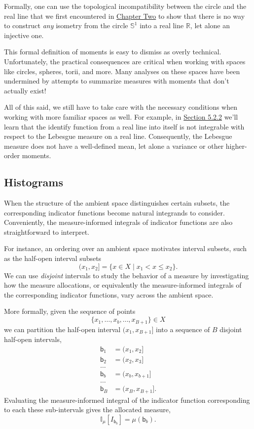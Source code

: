 \documentclass[
  letterpaper,
  DIV=11,
  numbers=noendperiod]{scrartcl}
\begin{document}
Formally, one can use the topological incompatibility between the circle
and the real line that we first encountered in
\href{http://www.symplectomorphic.com/assets/chapters_html/spaces.html}{Chapter
Two} to show that there is no way to construct \emph{any} isometry from
the circle \(\mathbb{S}^{1}\) into a real line \(\mathbb{R}\), let alone
an injective one.

This formal definition of moments is easy to dismiss as overly
technical. Unfortunately, the practical consequences are critical when
working with spaces like circles, spheres, torii, and more. Many
analyses on these spaces have been undermined by attempts to summarize
measures with moments that don't actually exist!

All of this said, we still have to take care with the necessary
conditions when working with more familiar spaces as well. For example,
in \hyperref[sec:practical_lebesgue]{Section 5.2.2} we'll learn that the
identify function from a real line into itself is not integrable with
respect to the Lebesgue measure on a real line. Consequently, the
Lebesgue measure does not have a well-defined mean, let alone a variance
or other higher-order moments.

\subsection{Histograms}\label{histograms}

When the structure of the ambient space distinguishes certain subsets,
the corresponding indicator functions become natural integrands to
consider. Conveniently, the measure-informed integrals of indicator
functions are also straightforward to interpret.

For instance, an ordering over an ambient space motivates interval
subsets, such as the half-open interval subsets \[
( x_{1}, x_{2} ] = \{ x \in X \mid x_{1} < x \le x_{2} \}.
\] We can use \emph{disjoint} intervals to study the behavior of a
measure by investigating how the measure allocations, or equivalently
the measure-informed integrals of the corresponding indicator functions,
vary across the ambient space.

More formally, given the sequence of points \[
\{ x_{1}, \ldots, x_{b}, \ldots, x_{B + 1} \} \in X
\] we can partition the half-open interval \((x_{1}, x_{B + 1}]\) into a
sequence of \(B\) disjoint half-open intervals, \begin{align*}
\mathsf{b}_{1} &= ( x_{1}, x_{2} ]
\\
\mathsf{b}_{2} &= ( x_{2}, x_{3} ]
\\
\ldots&
\\
\mathsf{b}_{b} &= ( x_{b}, x_{b + 1} ]
\\
\ldots&
\\
\mathsf{b}_{B} &= ( x_{B}, x_{B + 1} ].
\end{align*} Evaluating the measure-informed integral of the indicator
function corresponding to each these sub-intervals gives the allocated
measure, \[
\mathbb{I}_{\mu}[I_{\mathsf{b}_{b}}]
= \mu(\mathsf{b}_{b}).
\]
\end{document}
